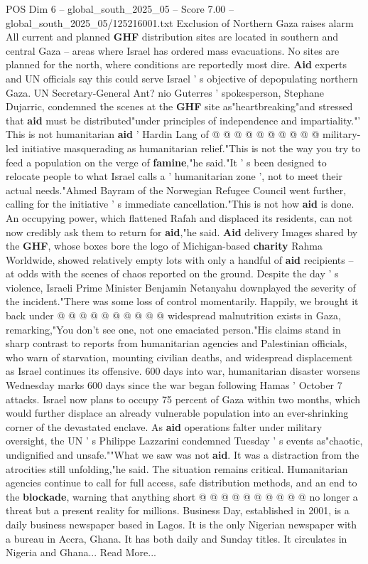 \begin{textsample}{POS Dim 6 – global\_south\_2025\_05 – Score 7.00 – global\_south\_2025\_05/125216001.txt}
Exclusion of Northern Gaza raises alarm All current and planned \textbf{GHF} distribution sites are located in southern and central Gaza -- areas where Israel has ordered mass evacuations.
No sites are planned for the north, where conditions are reportedly most dire. \textbf{Aid} experts and UN officials say this could serve Israel ' s objective of depopulating northern Gaza.
UN Secretary-General Ant? nio Guterres ' spokesperson, Stephane Dujarric, condemned the scenes at the \textbf{GHF} site as"heartbreaking"and stressed that \textbf{aid} must be distributed"under principles of independence and impartiality."' This is not humanitarian \textbf{aid} ' Hardin Lang of @ @ @ @ @ @ @ @ @ @ military-led initiative masquerading as humanitarian relief."This is not the way you try to feed a population on the verge of \textbf{famine},"he said."It ' s been designed to relocate people to what Israel calls a ' humanitarian zone ', not to meet their actual needs."Ahmed Bayram of the Norwegian Refugee Council went further, calling for the initiative ' s immediate cancellation."This is not how \textbf{aid} is done.
An occupying power, which flattened Rafah and displaced its residents, can not now credibly ask them to return for \textbf{aid},"he said. \textbf{Aid} delivery Images shared by the \textbf{GHF}, whose boxes bore the logo of Michigan-based \textbf{charity} Rahma Worldwide, showed relatively empty lots with only a handful of \textbf{aid} recipients -- at odds with the scenes of chaos reported on the ground.
Despite the day ' s violence, Israeli Prime Minister Benjamin Netanyahu downplayed the severity of the incident."There was some loss of control momentarily.
Happily, we brought it back under @ @ @ @ @ @ @ @ @ @ widespread malnutrition exists in Gaza, remarking,"You don't see one, not one emaciated person."His claims stand in sharp contrast to reports from humanitarian agencies and Palestinian officials, who warn of starvation, mounting civilian deaths, and widespread displacement as Israel continues its offensive. 600 days into war, humanitarian disaster worsens Wednesday marks 600 days since the war began following Hamas ' October 7 attacks.
Israel now plans to occupy 75 percent of Gaza within two months, which would further displace an already vulnerable population into an ever-shrinking corner of the devastated enclave.
As \textbf{aid} operations falter under military oversight, the UN ' s Philippe Lazzarini condemned Tuesday ' s events as"chaotic, undignified and unsafe.""What we saw was not \textbf{aid}.
It was a distraction from the atrocities still unfolding,"he said.
The situation remains critical.
Humanitarian agencies continue to call for full access, safe distribution methods, and an end to the \textbf{blockade}, warning that anything short @ @ @ @ @ @ @ @ @ @ no longer a threat but a present reality for millions.
Business Day, established in 2001, is a daily business newspaper based in Lagos.
It is the only Nigerian newspaper with a bureau in Accra, Ghana.
It has both daily and Sunday titles.
It circulates in Nigeria and Ghana...
Read More...

\end{textsample}
